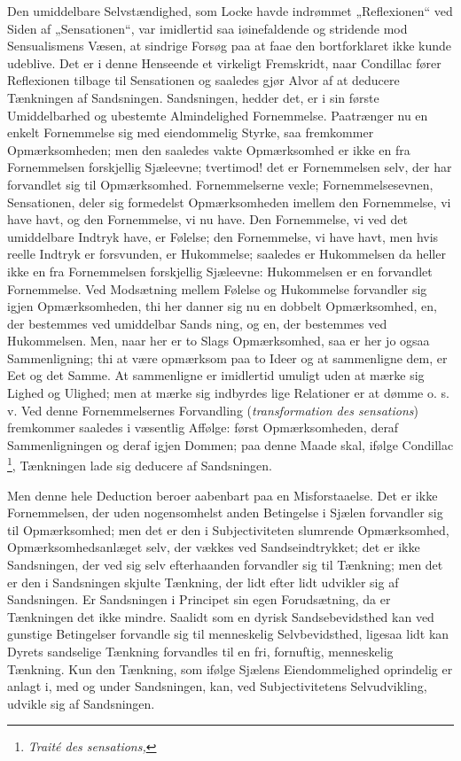 \documentclass[11pt]{book}
\newcommand{\opage}[1]{\marginnote{\footnotesize\textit{[#1]}}}
\begin{document}
Den umiddelbare Selvstændighed, som Locke havde indrømmet
„Reflexionen“ ved Siden af „Sensationen“, var imidlertid saa
iøinefaldende og stridende mod Sensualismens Væsen, at sindrige Forsøg
paa at faae den bortforklaret ikke kunde udeblive. Det er i denne
Henseende et virkeligt Fremskridt, naar Condillac fører Reflexionen
tilbage til Sensationen og saaledes gjør Alvor af at deducere
Tænkningen af Sandsningen. Sandsningen, hedder det, er i sin første
Umiddelbarhed og ubestemte Almindelighed Fornemmelse. Paatrænger nu en
enkelt Fornemmelse sig med eiendommelig Styrke, saa fremkommer
Opmærksomheden; men den saaledes vakte Opmærksomhed er ikke en fra
Fornemmelsen forskjellig Sjæleevne; tvertimod! det er Fornemmelsen
selv, der har forvandlet sig til Opmærksomhed. Fornemmelserne vexle;
Fornemmelsesevnen, Sensationen, deler sig formedelst Opmærksomheden
imellem den Fornemmelse, vi have havt, og den Fornemmelse, vi nu have.
Den Fornemmelse, vi ved det umiddelbare Indtryk have, er Følelse; den
Fornemmelse, vi have havt, men hvis reelle Indtryk er forsvunden, er
Hukommelse; saaledes er Hukommelsen da heller ikke en fra Fornemmelsen
forskjellig Sjæleevne: Hukommelsen er en forvandlet Fornemmelse. Ved
Modsætning mellem Følelse og Hukommelse forvandler sig igjen
Opmærksomheden, thi her danner sig nu en dobbelt Opmærksomhed, en, der
bestemmes ved umiddelbar Sands\-%
\opage{27} \setcounter{footnote}{0}%
ning, og en, der bestemmes ved Hukommelsen. Men, naar her er to Slags
Opmærksomhed, saa er her jo ogsaa Sammenligning; thi at være
opmærksom paa to Ideer og at sammenligne dem, er Eet og det Samme. At
sammenligne er imidlertid umuligt uden at mærke sig Lighed og Ulighed;
men at mærke sig indbyrdes lige Relationer er at dømme o. s. v. Ved
denne Fornemmelsernes Forvandling (\textit{transformation des
sensations}) fremkommer saaledes i væsentlig Affølge: først
Opmærksomheden, deraf Sammenligningen og deraf igjen Dommen; paa denne
Maade skal, ifølge Condillac%
\footnote{\textit{Traité des sensations,}%
}, Tænkningen lade sig deducere af Sandsningen.

Men denne hele Deduction beroer aabenbart paa en Misforstaaelse. Det
er ikke Fornemmelsen, der uden nogensomhelst anden Betingelse i Sjælen
forvandler sig til Opmærksomhed; men det er den i Subjectiviteten
slumrende Opmærksomhed, Opmærksomhedsanlæget selv, der vækkes ved
Sandseindtrykket; det er ikke Sandsningen, der ved sig selv
efterhaanden forvandler sig til Tænkning; men det er den i Sandsningen
skjulte Tænkning, der lidt efter lidt udvikler sig af Sandsningen. Er
Sandsningen i Principet sin egen Forudsætning, da er Tænkningen det
ikke mindre. Saalidt som en dyrisk Sandsebevidsthed kan ved gunstige
Betingelser forvandle sig til menneskelig Selvbevidsthed, ligesaa lidt
kan Dyrets sandselige Tænkning forvandles til en fri, fornuftig,
menneskelig Tænkning. Kun den Tænkning, som ifølge Sjælens
Eiendommelighed oprindelig er anlagt i, med og under Sandsningen, kan,
ved Subjectivitetens Selvudvikling, udvikle sig af Sandsningen.
\end{document}

